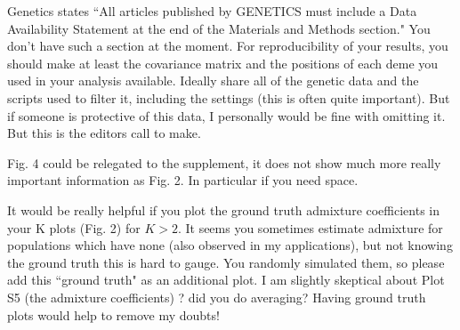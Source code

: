  
\begin{point}{}
    Genetics states ``All articles published by GENETICS must include a 
Data Availability Statement at the end of the Materials and Methods section." 
You don't have such a section at the moment.
For reproducibility of your results, 
you should make at least the covariance matrix and the positions of each deme you used in your analysis available. 
Ideally share all of the genetic data and the scripts used to filter it, including the settings (this is often quite important). 
But if someone is protective of this data, I personally would be fine with omitting it. But this is the editors call to make.
\end{point}


\begin{point}{}
    Fig. 4 could be relegated to the supplement, it does not show much more really important information as Fig. 2. 
 In particular if you need space.
\end{point}


\begin{point}{}
    It would be really helpful if you plot the ground truth admixture coefficients in your K plots (Fig. 2) for $K>2$. 
 It seems you sometimes estimate admixture for populations which have none (also observed in my applications), 
 but not knowing the ground truth this is hard to gauge. 
 You randomly simulated them, so please add this ``ground truth" as an additional plot. 
 I am slightly skeptical about Plot S5 (the admixture coefficients) ? did you do averaging? 
 Having ground truth plots would help to remove my doubts!
\end{point}

